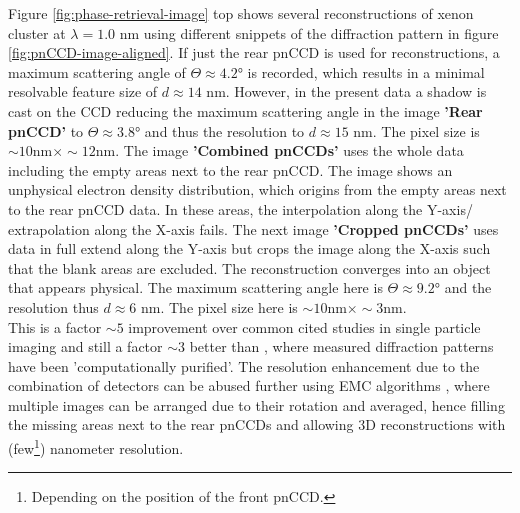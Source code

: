 Figure \ref{fig:phase-retrieval-image} top shows several reconstructions of xenon cluster at $\lambda = 1.0$ nm using different snippets of the diffraction pattern in figure \ref{fig:pnCCD-image-aligned}. If just the rear pnCCD is used for reconstructions, a maximum scattering angle of $\Theta\approx 4.2$° is recorded, which results in a minimal resolvable feature size of $d\approx 14$ nm. However, in the present data a shadow is cast on the CCD reducing the maximum scattering angle in the image \textbf{'Rear pnCCD'} to $\Theta\approx 3.8$° and thus the resolution to $d\approx 15$ nm. The pixel size is $\sim 10 \text{nm} \times \sim 12 \text{nm}$. The image \textbf{'Combined pnCCDs'} uses the whole data including the empty areas next to the rear pnCCD. The image shows an unphysical electron density distribution, which origins from the empty areas next to the rear pnCCD data. In these areas, the interpolation along the Y-axis/ extrapolation along the X-axis fails. The next image \textbf{'Cropped pnCCDs'} uses data in full extend along the Y-axis but crops the image along the X-axis such that the blank areas are excluded. The reconstruction converges into an object that appears physical. The maximum scattering angle here is $\Theta \approx 9.2$° and the resolution thus $d\approx 6$ nm. The pixel size here is $\sim 10 \text{nm} \times \sim 3 \text{nm}$.\\
This is a factor $\sim 5$ improvement over common cited studies in single particle imaging \citep{Seibert-2011-Nature} and still a factor $\sim 3$ better than \citep{Hantke-2014-NatPho}, where measured diffraction patterns have been 'computationally purified'. The resolution enhancement due to the combination of detectors can be abused further using EMC algorithms \citep{Loh-2009-PRE}, where multiple images can be arranged due to their rotation and averaged, hence filling the missing areas next to the rear pnCCDs and allowing 3D reconstructions with (few\footnote{Depending on the position of the front pnCCD.}) nanometer resolution.\\
%
%
%
